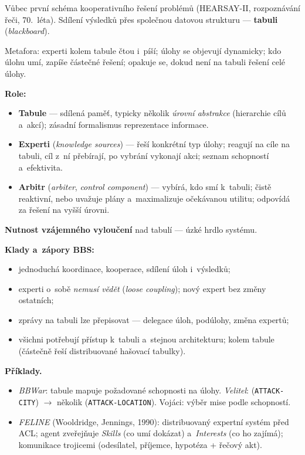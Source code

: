 \documentclass[11pt,a4paper]{article}
\theoremstyle{definition}
\begin{document}
\begin{defbox}
Vůbec první schéma kooperativního řešení problémů (HEARSAY-II, rozpoznávání řeči,
70.~léta). Sdílení výsledků přes společnou datovou strukturu --- \textbf{tabuli}
(\emph{blackboard}).

Metafora: experti kolem tabule čtou i~píší; úlohy se objevují dynamicky; kdo úlohu umí,
zapíše částečné řešení; opakuje se, dokud není na tabuli řešení celé úlohy.

\textbf{Role:}
\begin{itemize}
\item \textbf{Tabule} --- sdílená paměť, typicky několik \emph{úrovní abstrakce} (hierarchie
  cílů a~akcí); zásadní formalismus reprezentace informace.
\item \textbf{Experti} (\emph{knowledge sources}) --- řeší konkrétní typ úlohy; reagují na
  cíle na tabuli, cíl z~ní přebírají, po vybrání vykonají akci; seznam schopností
  a~efektivita.
\item \textbf{Arbitr} (\emph{arbiter}, \emph{control component}) --- vybírá, kdo smí
  k~tabuli; čistě reaktivní, nebo uvažuje plány a~maximalizuje očekávanou utilitu;
  odpovídá za řešení na vyšší úrovni.
\end{itemize}
\textbf{Nutnost vzájemného vyloučení} nad tabulí --- úzké hrdlo systému.
\end{defbox}

\textbf{Klady a~zápory BBS:}
\begin{itemize}
\item[$+$] jednoduchá koordinace, kooperace, sdílení úloh i~výsledků;
\item[$+$] experti o~sobě \emph{nemusí vědět} (\emph{loose coupling}); nový expert bez
  změny ostatních;
\item[$+$] zprávy na tabuli lze přepisovat --- delegace úloh, podúlohy, změna expertů;
\item[$-$] všichni potřebují přístup k~tabuli a~stejnou architekturu; kolem tabule
   (částečně řeší distribuované hašovací tabulky).
\end{itemize}

\textbf{Příklady.}
\begin{itemize}
\item \emph{BBWar}: tabule mapuje požadované schopnosti na úlohy. \emph{Velitel}:
   (\texttt{ATTACK-\allowbreak CITY}) $\to$ několik  (\texttt{ATTACK-\allowbreak LOCATION}). Vojáci: výběr mise podle schopností.
\item \emph{FELINE} (Wooldridge, Jennings, 1990): distribuovaný expertní systém před ACL;
  agent zveřejňuje \emph{Skills} (co umí dokázat) a~\emph{Interests} (co ho zajímá);
  komunikace trojicemi (odesílatel, příjemce, hypotéza + řečový akt).
\end{itemize}
\end{document}
